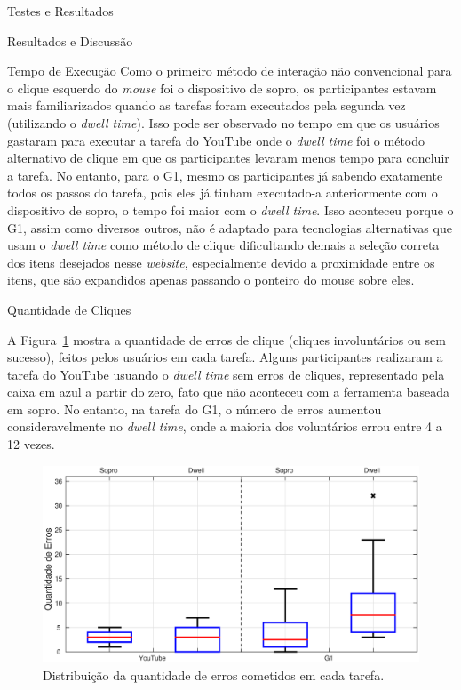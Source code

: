 \begin{chapter}{Testes e Resultados}
\begin{section}{Resultados e Discussão}
\begin{subsection}{Tempo de Execução}
Como o primeiro método de interação não convencional para o clique esquerdo do
\textit{mouse} foi o dispositivo de sopro, os participantes estavam mais
familiarizados quando as tarefas foram executados pela segunda vez (utilizando o
\textit{dwell time}). Isso pode ser observado no tempo em que os usuários
gastaram para executar a tarefa do YouTube onde o \textit{dwell time} foi o
método alternativo de clique em que  os participantes levaram menos tempo para
concluir a tarefa. No entanto, para o G1, mesmo os participantes já sabendo
exatamente todos os passos do tarefa, pois eles já tinham executado-a
anteriormente com o dispositivo de sopro, o tempo foi maior com o
\textit{dwell time}. Isso aconteceu porque o G1, assim como diversos outros, não
é adaptado para tecnologias alternativas que usam o \textit{dwell time} como
método de clique dificultando demais a seleção correta dos itens desejados nesse
\textit{website}, especialmente devido a proximidade entre os itens, que são
expandidos apenas passando o ponteiro do mouse sobre eles.

\end{subsection}

\begin{subsection}{Quantidade de Cliques}

A Figura~\ref{fig:cliques} mostra a quantidade de erros de clique (cliques
involuntários ou sem sucesso), feitos pelos usuários em cada tarefa. Alguns
participantes realizaram a tarefa do YouTube usuando o \textit{dwell time} sem
erros de cliques, representado pela caixa em azul a partir do zero, fato que não
aconteceu com a ferramenta baseada em sopro. No entanto, na tarefa do G1, o
número de erros aumentou consideravelmente no \textit{dwell time}, onde a
maioria dos voluntários errou entre 4 a 12 vezes.

\begin{figure}[!h]
	\centering
	\includegraphics[width=1.00\linewidth]{fig/erros}
	\caption{Distribuição da quantidade de erros cometidos em cada tarefa.}
	\label{fig:cliques}
\end{figure}


\end{subsection}
\end{section}
\end{chapter}
